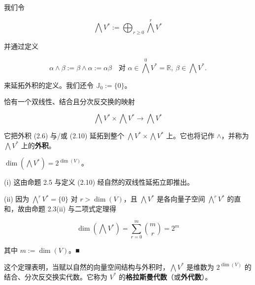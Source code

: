 \begin{remark}
\begin{items}
\end{items}

我们令

\[
\bigwedge V^{*} := \bigoplus_{r\ge 0}\bigwedge^{r}V^{*}
\]

并通过定义

\begin{equation}
\alpha\wedge\beta := \beta\wedge\alpha := \alpha\beta \quad \text{对 } \alpha \in \bigwedge^{0}V^{*} = \mathbb{R},\ \beta \in \bigwedge V^{*}.\tag{2.10}
\end{equation}

来延拓外积的定义。我们还令 $ \mathbb{J}_{0} := \{0\} $。

\end{remark}

\begin{theorem}

\begin{subitems}
\item

恰有一个双线性、结合且分次反交换的映射

\[
\bigwedge V^{*}\times\bigwedge V^{*} \to \bigwedge V^{*}
\]

它把外积 (2.6) 与/或 (2.10) 延拓到整个 $ \bigwedge V^{*}\times\bigwedge V^{*} $ 上。它也将记作 $ \wedge $，并称为 $ \bigwedge V^{*} $ 上的\textbf{外积}。

\item

$ \dim\left(\bigwedge V^{*}\right) = 2^{\dim(V)} $。

\proofhead
(i) 这由命题 2.5 与定义 (2.10) 经自然的双线性延拓立即推出。
\end{subitems}

(ii) 因为 $ \bigwedge^{r}V^{*} = \{0\} $ 对 $ r > \dim(V) $，且 $ \bigwedge V^{*} $ 是各向量子空间 $ \bigwedge^{r}V^{*} $ 的直和，故由命题 2.3(ii) 与二项式定理得

\[
\dim\left(\bigwedge V^{*}\right) = \sum_{r=0}^{m}\binom{m}{r} = 2^{m}
\]

其中 $ m := \dim(V) $。\nobreak\hspace{0.35em}■

\end{theorem}

这个定理表明，当赋以自然的向量空间结构与外积时，$ \bigwedge V^{*} $ 是维数为 $ 2^{\dim(V)} $ 的结合、分次反交换实代数。它称为 $ V^{*} $ 的\textbf{格拉斯曼代数}（或\textbf{外代数}）。

